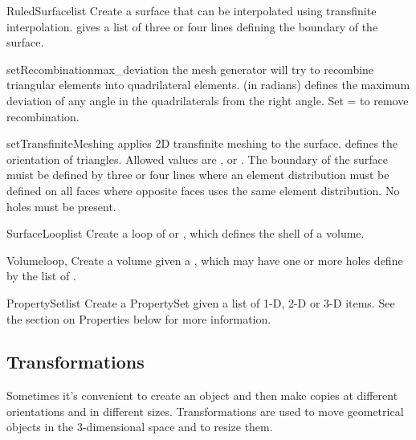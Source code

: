 \begin{classdesc}{RuledSurface}{list}
Create a surface that can be interpolated using transfinite interpolation.
 gives a list of three or four lines defining the boundary of the
surface.
\end{classdesc}
\begin{methoddesc}[RuledSurface]{setRecombination}{max_deviation}
the mesh generator will try to recombine triangular elements 
into quadrilateral elements.  (in radians) defines the
maximum deviation of any angle in the quadrilaterals from the right angle.  
Set = to remove recombination.
\end{methoddesc}
\begin{methoddesc}[RuledSurface]{setTransfiniteMeshing}{}
applies 2D transfinite meshing to the surface. 
 defines the orientation of triangles. Allowed values
are ,  or . The 
boundary of the surface muist be defined by three or four lines where an
element distribution must be defined on all faces where opposite 
faces uses the same element distribution. No holes must be present.
\end{methoddesc}


\begin{classdesc}{SurfaceLoop}{list}
Create a loop of  or , which defines the shell of a volume.
\end{classdesc}

\begin{classdesc}{Volume}{loop, }
Create a volume given a , which may have one or more holes
define by the list of .
\end{classdesc}

\begin{classdesc}{PropertySet}{list}
Create a PropertySet given a list of 1-D, 2-D or 3-D items. See the section on Properties below for more information.
\end{classdesc}

\subsection{Transformations}

Sometimes it's convenient to create an object and then make copies at
different orientations and in different sizes.  Transformations are
used to move geometrical objects in the 3-dimensional space and to
resize them.

